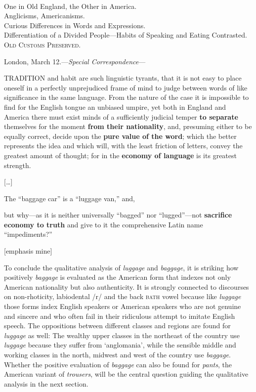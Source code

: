 \begin{ipquote}
\begin{center}
\\
One in Old England, the Other in America.\\
Anglicisms, Americanisms.\\
Curious Differences in Words and Expressions.\\
Differentiation of a Divided People—Habits of Speaking and Eating Contrasted.\\
\textsc{Old Customs Preserved}.
\end{center}

London, March 12.—\textit{Special Correspondence}—

{TRADITION and habit are such linguistic tyrants, that it is not easy to place oneself in a perfectly unprejudiced frame of mind to judge between words of like significance in the same language. From the nature of the case it is impossible to find for the English tongue an unbiased umpire, yet both in England and America there must exist minds of a sufficiently judicial temper \textbf{to separate} themselves for the moment \textbf{from their nationality}, and, presuming either to be equally correct, decide upon the \textbf{pure value of the word}; which the better represents the idea and which will, with the least friction of letters, convey the greatest amount of thought; for in the \textbf{economy of language} is its greatest strength.

\centering
{[…]}

The “baggage car” is a “luggage van,” and, } {but why—as it is neither universally “bagged” nor “lugged”—not \textbf{sacrifice economy to truth} and give to it the comprehensive Latin name “impediments?”

\raggedleft
{[emphasis mine]}\\
}
\end{ipquote}

To conclude the qualitative analysis of \emph{luggage} and \emph{baggage}, it is striking how positively \emph{baggage} is evaluated as the American form that indexes not only American nationality but also authenticity. It is strongly connected to discourses on non-rhoticity, labiodental /r/ and the back \textsc{bath} vowel because like \emph{luggage} those forms index English speakers or American speakers who are not genuine and sincere and who often fail in their ridiculous attempt to imitate English speech. The oppositions between different classes and regions are found for \emph{luggage} as well: The wealthy upper classes in the northeast of the country use \emph{luggage} because they suffer from ‘anglomania’, while the sensible middle and working classes in the north, midwest and west of the country use \emph{baggage}. Whether the positive evaluation of \emph{baggage} can also be found for \emph{pants}, the American variant of \emph{trousers}, will be the central question guiding the qualitative analysis in the next section.

